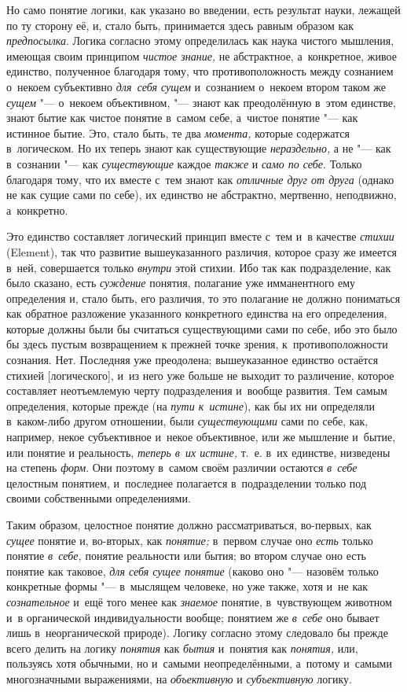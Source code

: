 Но само понятие логики, как указано во введении, есть результат науки,
лежащей по ту сторону её, и, стало быть, принимается здесь равным образом
как {\em предпосылка}. Логика согласно этому
определилась как наука чистого мышления, имеющая своим принципом
{\em чистое знание,} не абстрактное, а~конкретное,
живое единство, полученное благодаря тому, что
противоположность между сознанием о~некоем субъективно {\em для~себя сущем}
и~сознанием о~некоем втором таком же {\em сущем} "--- о~некоем
объективном, "--- знают как преодолённую в~этом единстве, знают бытие как
чистое понятие в~самом себе, а~чистое понятие "--- как истинное бытие.
Это, стало быть, те два
{\em момента,} которые содержатся в~логическом. Но их теперь знают как
существующие {\em нераздельно,} а
не "--- как в~сознании "--- как {\em существующие} каждое {\em также} и
{\em само по себе}. Только благодаря тому, что их вместе с~тем знают как
{\em отличные друг от друга} (однако не как сущие сами по
себе), их единство не абстрактно, мертвенно, неподвижно, а~конкретно.

Это единство составляет логический принцип вместе с~тем и~в качестве
{\em стихии} (Ele\-ment), так что развитие вышеуказанного
различия, которое сразу же имеется в~ней, совершается только
{\em внутри} этой стихии. Ибо так как подразделение,
как было сказано, есть {\em суждение} понятия,
полагание уже имманентного ему определения и, стало быть, его различия, то
это полагание не должно пониматься как обратное разложение указанного
конкретного единства на его определения, которые должны были бы считаться
существующими сами по себе, ибо это было бы здесь пустым возвращением к
прежней точке зрения, к~противоположности сознания. Нет. Последняя уже
преодолена; вышеуказанное единство остаётся стихией [логического], и~из
него уже больше не выходит то различение, которое составляет неотъемлемую
черту подразделения и~вообще развития. Тем самым определения, которые
прежде (на {\em пути к~истине}), как бы их ни
определяли в~каком-либо другом отношении, были
{\em существующими} сами по себе, как, например, некое
субъективное и~некое объективное, или же мышление и~бытие, или понятие и
реальность, {\em теперь в~их истине,} т.~е. в~их
единстве, низведены на степень {\em форм}. Они поэтому
в~самом своём различии остаются {\em в~себе} целостным
понятием, и~последнее полагается в~подразделении только под своими
собственными определениями.

Таким образом, целостное понятие должно рассматриваться, во-первых, как
{\em сущее} понятие и, во-вторых, как {\em понятие;} в~первом случае оно
{\em есть} только понятие {\em в~себе,} понятие реальности или бытия;
во втором случае оно есть понятие как таковое, {\em для себя сущее понятие}
(каково оно "--- назовём только конкретные формы "--- в~мыслящем человеке,
но уже также, хотя и~не как {\em сознательное} и~ещё того менее как
{\em знаемое} понятие, в~чувствующем животном и~в
органической индивидуальности вообще; понятием же
{\em в~себе} оно бывает лишь в~неорганической природе).
Логику согласно этому следовало бы прежде всего делить на логику
{\em понятия} как {\em бытия} и~понятия как {\em понятия,} или, пользуясь
хотя обычными, но и~самыми неопределёнными, а~потому и~самыми многозначными
выражениями, на {\em объективную} и {\em субъективную} логику.

